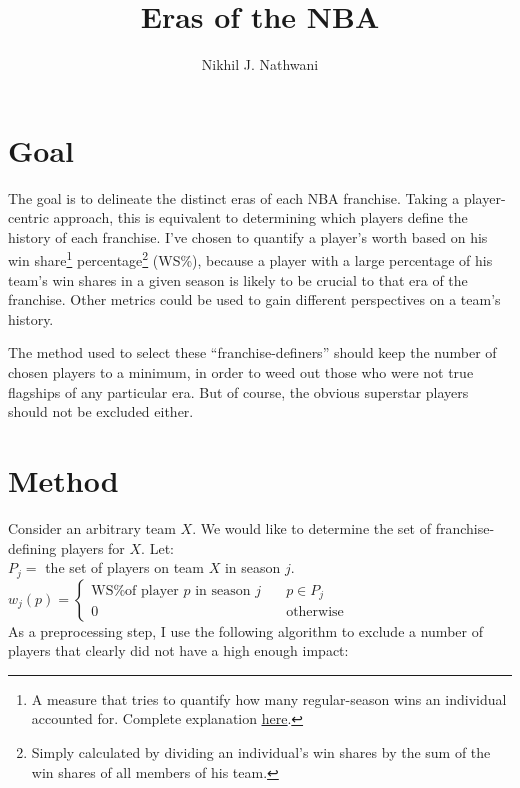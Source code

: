 \documentclass[a4paper,11pt]{article}
\author{Nikhil J. Nathwani}
\title{Eras of the NBA}
\begin{document}
       \maketitle

\section{Goal}
The goal is to delineate the distinct eras of each NBA franchise. Taking a player-centric approach, this is equivalent to determining which players define the history of each franchise. I've chosen to quantify a player's worth based on his win share\footnote{A measure that tries to quantify how many regular-season wins an individual accounted for. Complete explanation \textcolor{blue}{\underline{\href{http://www.basketball-reference.com/about/ws.html}{here}}}.} percentage\footnote{Simply calculated by dividing an individual's win shares by the sum of the win shares of all members of his team.} (WS\%), because a player with a large percentage of his team's win shares in a given season is likely to be crucial to that era of the franchise. Other metrics could be used to gain different perspectives on a team's history.

The method used to select these ``franchise-definers'' should keep the number of chosen players to a minimum, in order to weed out those who were not true flagships of any particular era. But of course, the obvious superstar players should not be excluded either.

\section{Method}
Consider an arbitrary team $X$. We would like to determine the set of franchise-defining players for $X$. Let:\\

$P_j=$ the set of players on team $X$ in season $j$.\\ 


$w_j(p) = \left\{ \begin{array}{ll}
		            \text{WS\% of player } p \text{ in season } j & \quad p \in P_j\\
		            0 & \quad \text{otherwise}
		        \end{array}
 		   \right. $\\



As a preprocessing step, I use the following algorithm to exclude a number of players that clearly did not have a high enough impact:\\
\end{document}

